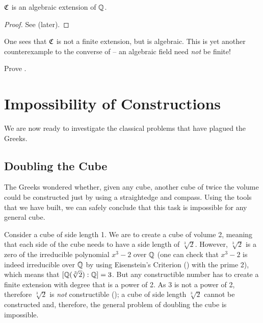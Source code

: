 \begin{corollary}\label{corollary-field-of-all-constructible-numbers-is-algebraic-extension}
    $\mathfrak{C}$ is an algebraic extension of $\mathbb{Q}$.
\end{corollary}
\begin{proof}
    See  (later).
\end{proof}

One sees that $\mathfrak{C}$ is not a finite extension, but is algebraic. This is yet another counterexample to the converse of  -- an algebraic field need \textit{not} be finite!

\begin{exercise}\label{exercise-field-of-all-constructible-numbers-is-algebraic-extension}
    Prove .
\end{exercise}

\section{Impossibility of Constructions}
We are now ready to investigate the classical problems that have plagued the Greeks.

\subsection{Doubling the Cube}
The Greeks wondered whether, given any cube, another cube of twice the volume could be constructed just by using a straightedge and compass. Using the tools that we have built, we can safely conclude that this task is impossible for any general cube.

Consider a cube of side length 1. We are to create a cube of volume 2, meaning that each side of the cube needs to have a side length of $\sqrt[3]2$. However, $\sqrt[3]2$ is a zero of the irreducible polynomial $x^3 - 2$ over $\mathbb{Q}$ (one can check that $x^3-2$ is indeed irreducible over $\mathbb{Q}$ by using Eisenstein's Criterion () with the prime 2), which means that $[\mathbb{Q}(\sqrt[3]2):\mathbb{Q}] = 3$. But any constructible number has to create a finite extension with degree that is a power of 2. As 3 is not a power of 2, therefore $\sqrt[3]2$ is \textit{not} constructible (); a cube of side length $\sqrt[3]2$ cannot be constructed and, therefore, the general problem of doubling the cube is impossible.

